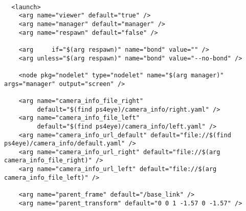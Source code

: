 \begin{center}
\begin{footnotesize}
\begin{verbatim}

  <launch>
    <arg name="viewer" default="true" />
    <arg name="manager" default="manager" />
    <arg name="respawn" default="false" />

    <arg     if="$(arg respawn)" name="bond" value="" />
    <arg unless="$(arg respawn)" name="bond" value="--no-bond" />

    <node pkg="nodelet" type="nodelet" name="$(arg manager)" args="manager" output="screen" />

    <arg name="camera_info_file_right"
         default="$(find ps4eye)/camera_info/right.yaml" />
    <arg name="camera_info_file_left"
         default="$(find ps4eye)/camera_info/left.yaml" />
    <arg name="camera_info_url_default" default="file://$(find ps4eye)/camera_info/default.yaml" />
    <arg name="camera_info_url_right" default="file://$(arg camera_info_file_right)" />
    <arg name="camera_info_url_left" default="file://$(arg camera_info_file_left)" />

    <arg name="parent_frame" default="/base_link" />
    <arg name="parent_transform" default="0 0 1 -1.57 0 -1.57" />


\end{verbatim}
\end{footnotesize}
\end{center}
